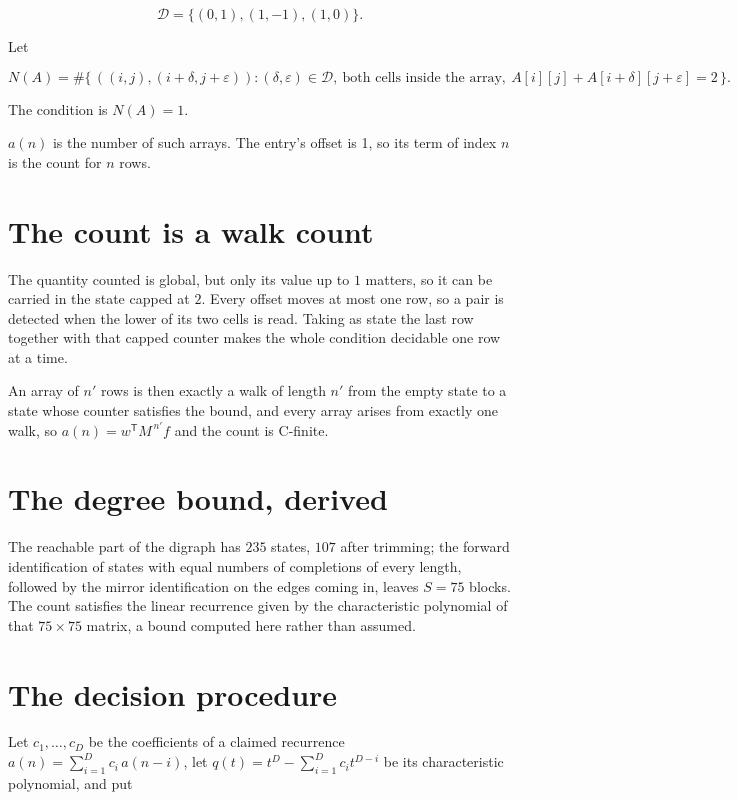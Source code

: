 \documentclass[11pt]{article}
\theoremstyle{definition}
\begin{document}
\[\mathcal{D} = \{(0,1), (1,-1), (1,0)\}.\]

Let

\[N(A) = \#\bigl\{\,((i,j),(i{+}\delta,j{+}\varepsilon)) : (\delta,\varepsilon) \in \mathcal{D},\ \text{both cells inside the array},\ A[i][j] + A[i{+}\delta][j{+}\varepsilon] = 2\,\bigr\}.\]

The condition is $N(A) = 1$.

$a(n)$ is the number of such arrays. The entry's offset is 1, so its term of index $n$ is the count for $n$ rows.

\section{The count is a walk count}

The quantity counted is global, but only its value up to $1$ matters, so it can be carried in the state capped at $2$. Every offset moves at most one row, so a pair is detected when the lower of its two cells is read. Taking as state the last row together with that capped counter makes the whole condition decidable one row at a time.

An array of $n'$ rows is then exactly a walk of length $n'$ from the empty state to a state whose counter satisfies the bound, and every array arises from exactly one walk, so $a(n) = w^{\mathsf T}M^{\,n'}f$ and the count is C-finite.

\section{The degree bound, derived}

The reachable part of the digraph has $235$ states, $107$ after trimming; the forward identification of states with equal numbers of completions of every length, followed by the mirror identification on the edges coming in, leaves $S = 75$ blocks. The count satisfies the linear recurrence given by the characteristic polynomial of that $75\times75$ matrix, a bound computed here rather than assumed.

\section{The decision procedure}

Let $c_1,\dots,c_D$ be the coefficients of a claimed recurrence $a(n) = \sum_{i=1}^{D} c_i\,a(n-i)$, let $q(t) = t^{D} - \sum_{i=1}^{D} c_i t^{D-i}$ be its characteristic polynomial, and put
\end{document}

